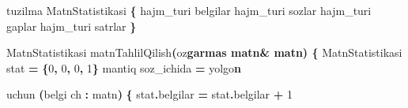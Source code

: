 \documentclass[a4paper,11pt,twoside,openright]{book}
\newenvironment{Shaded}{\begin{snugshade}}{\end{snugshade}}
\newcommand{\CharTok}[1]{\textcolor[rgb]{0.31,0.60,0.02}{#1}}
\newcommand{\DecValTok}[1]{\textcolor[rgb]{0.00,0.00,0.81}{#1}}
\newcommand{\ErrorTok}[1]{\textcolor[rgb]{0.64,0.00,0.00}{\textbf{#1}}}
\newcommand{\NormalTok}[1]{#1}
\newcommand{\OperatorTok}[1]{\textcolor[rgb]{0.81,0.36,0.00}{\textbf{#1}}}
\begin{document}
\begin{Shaded}
\begin{Highlighting}[]
\NormalTok{tuzilma MatnStatistikasi }\OperatorTok{\{}
\NormalTok{    hajm\_turi belgilar}
\NormalTok{    hajm\_turi sozlar}
\NormalTok{    hajm\_turi gaplar}
\NormalTok{    hajm\_turi satrlar}
\OperatorTok{\}}

\NormalTok{MatnStatistikasi matnTahlilQilish}\OperatorTok{(}\NormalTok{o}\CharTok{\textquotesingle{}z}\ErrorTok{garmas matn\& matn) \{}
\NormalTok{    MatnStatistikasi stat }\OperatorTok{=} \OperatorTok{\{}\DecValTok{0}\OperatorTok{,} \DecValTok{0}\OperatorTok{,} \DecValTok{0}\OperatorTok{,} \DecValTok{1}\OperatorTok{\}}
\NormalTok{    mantiq soz\_ichida }\OperatorTok{=}\NormalTok{ yolg}\CharTok{\textquotesingle{}o}\ErrorTok{n}

\NormalTok{    uchun }\OperatorTok{(}\NormalTok{belgi ch }\OperatorTok{:}\NormalTok{ matn}\OperatorTok{)} \OperatorTok{\{}
\NormalTok{        stat}\OperatorTok{.}\NormalTok{belgilar }\OperatorTok{=}\NormalTok{ stat}\OperatorTok{.}\NormalTok{belgilar }\OperatorTok{+} \DecValTok{1}


\end{Highlighting}
\end{Shaded}
\end{document}

